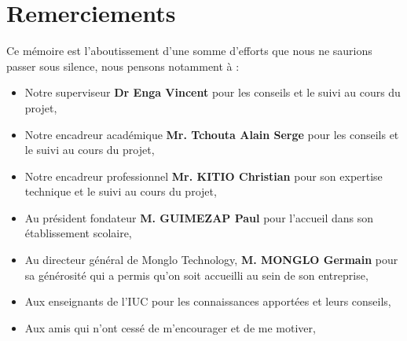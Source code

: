 \chapter*{Remerciements}         %

Ce mémoire est l'aboutissement d'une somme d'efforts que nous ne saurions passer sous silence, nous pensons notamment à :

\begin{itemize}
    \item Notre superviseur \textbf{Dr Enga Vincent} pour les conseils et le suivi au cours du projet,
    \item Notre encadreur académique  \textbf{Mr. Tchouta Alain Serge} pour les conseils et le suivi au
    cours du projet,
    \item  Notre encadreur professionnel \textbf{Mr. KITIO Christian} pour son expertise technique et le suivi au cours du projet,
    \item Au président fondateur \textbf{M. GUIMEZAP Paul} pour l’accueil dans son établissement scolaire,
    \item Au directeur général de Monglo Technology, \textbf{M. MONGLO Germain} pour sa générosité qui a permis qu'on soit accueilli au sein de son entreprise,
    \item Aux enseignants de l’IUC pour les connaissances apportées et leurs conseils,
    \item Aux amis qui n’ont cessé de m’encourager et de me motiver,
\end{itemize}